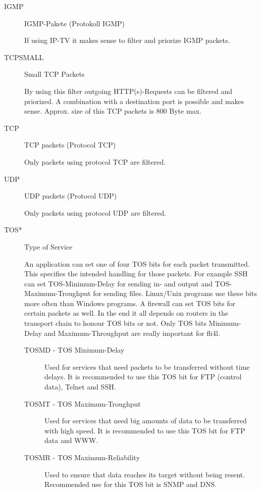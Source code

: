 \begin{description}
\begin{description}
 \item[IGMP] IGMP-Pakete (Protokoll IGMP)

   If using IP-TV it makes sense to filter and priorize IGMP packets.

 \item[TCPSMALL] Small TCP Packets

   By using this filter outgoing HTTP(s)-Requests can be filtered and priorized.
   A combination with a destination port is possible and makes sense.
   Approx. size of this TCP packets is 800 Byte max.

 \item[TCP]    TCP packets (Protocol TCP)

   Only packets using protocol TCP are filtered.

 \item[UDP]  UDP packets (Protocol UDP)

   Only packets using protocol UDP are filtered.


 \item[TOS*] Type of Service

   An application can set one of four TOS bits for each packet transmitted.
   This specifies the intended handling for those packets. For example SSH
   can set TOS-Minimum-Delay for sending in- and output and
   TOS-Maximum-Troughput for sending files. Linux/Unix programs use these
   bits more often than Windows programs. A firewall can set TOS bits for
   certain packets as well. In the end it all depends on routers in the
   transport chain to honour TOS bits or not. Only TOS bits Minimum-Delay
   and Maximum-Throughput are really important for fli4l.

   \begin{description}
   \item [TOSMD - TOS Minimum-Delay]

   Used for services that need packets to be transferred without time delays.
   It is recommended to use this TOS bit for FTP (control data), Telnet and SSH.


 \item[TOSMT - TOS Maximum-Troughput]

   Used for services that need big amounts of data to be transferred with
   high speed. It is recommended to use this TOS bit for FTP data and WWW.


 \item[TOSMR - TOS Maximum-Reliability]

   Used to ensure that data reaches its target without being resent.
   Recommended use for this TOS bit is SNMP and DNS.



\end{description}
\end{description}
\end{description}
